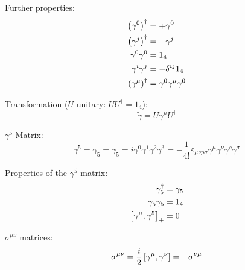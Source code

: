 			\noindent
			Further properties:
			\begin{equation}
				\begin{aligned}
					\Br{\gamma^0}^\dagger &= +\gamma^0 \\
					\Br{\gamma^j}^\dagger &= -\gamma^j \\
					\gamma^0 \gamma^0 &= 1_4 \\ %
					\gamma^i \gamma^j &= - \delta^{ij} 1_4 \\
					\Br{\gamma^\mu}^\dagger &= \gamma^0 \gamma^\mu \gamma^0 \\
				\end{aligned}
			\end{equation}

			\noindent
			Transformation ($U$ unitary: $U U^\dagger=1_4$):
			\begin{equation}
				\tilde{\gamma} = U \gamma^\mu U^\dagger
			\end{equation}

			\noindent
			$\gamma^5$-Matrix:
			\begin{equation}
				\gamma^5 = \gamma_5 = \gamma_5 = i\gamma^0 \gamma^1 \gamma^2 \gamma^3 = -\frac{1}{4!}\varepsilon_{\mu\nu\rho\sigma} \gamma^\mu \gamma^\nu \gamma^\rho \gamma^\sigma
			\end{equation}

			\noindent
			Properties of the $\gamma^5$-matrix:
			\begin{equation}
				\begin{aligned}
					\gamma_5^\dagger &= \gamma_5 \\
					\gamma_5 \gamma_5 &= 1_4 \\
					\left[\gamma^\mu,\gamma^5\right]_{+} &= 0 \\
				\end{aligned}
			\end{equation}

			\noindent
			$\sigma^{\mu\nu}$ matrices:
			\begin{equation}
				\sigma^{\mu\nu} = \frac{i}{2}\left[\gamma^\mu,\gamma^\nu\right] = -\sigma^{\nu\mu}
			\end{equation}


